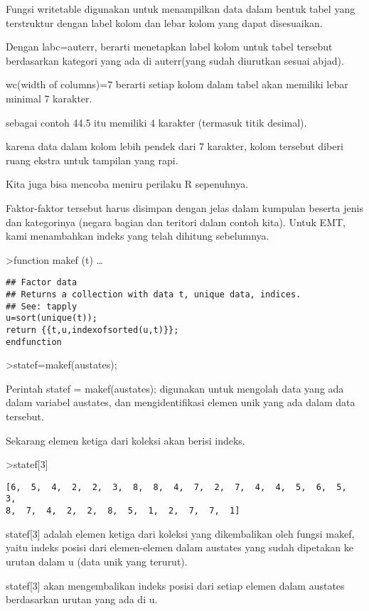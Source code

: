 \documentclass[
]{book}
\begin{document}
Fungsi writetable digunakan untuk menampilkan data dalam bentuk tabel yang terstruktur dengan label kolom dan lebar kolom yang dapat disesuaikan.

Dengan labc=auterr, berarti menetapkan label kolom untuk tabel tersebut berdasarkan kategori yang ada di auterr(yang sudah diurutkan sesuai abjad).

wc(width of columns)=7 berarti setiap kolom dalam tabel akan memiliki lebar minimal 7 karakter.

sebagai contoh 44.5 itu memiliki 4 karakter (termasuk titik desimal).

karena data dalam kolom lebih pendek dari 7 karakter, kolom tersebut diberi ruang ekstra untuk tampilan yang rapi.

Kita juga bisa mencoba meniru perilaku R sepenuhnya.

Faktor-faktor tersebut harus disimpan dengan jelas dalam kumpulan beserta jenis dan kategorinya (negara bagian dan teritori dalam contoh kita). Untuk EMT, kami menambahkan indeks yang telah dihitung sebelumnya.

\textgreater function makef (t) \ldots{}

\begin{verbatim}
## Factor data
## Returns a collection with data t, unique data, indices.
## See: tapply
u=sort(unique(t));
return {{t,u,indexofsorted(u,t)}};
endfunction
\end{verbatim}

\textgreater statef=makef(austates);

Perintah statef = makef(austates); digunakan untuk mengolah data yang ada dalam variabel austates, dan mengidentifikasi elemen unik yang ada dalam data tersebut.

Sekarang elemen ketiga dari koleksi akan berisi indeks.

\textgreater statef{[}3{]}

\begin{verbatim}
[6,  5,  4,  2,  2,  3,  8,  8,  4,  7,  2,  7,  4,  4,  5,  6,  5,  3,
8,  7,  4,  2,  2,  8,  5,  1,  2,  7,  7,  1]
\end{verbatim}

statef{[}3{]} adalah elemen ketiga dari koleksi yang dikembalikan oleh fungsi makef, yaitu indeks posisi dari elemen-elemen dalam austates yang sudah dipetakan ke urutan dalam u (data unik yang terurut).

statef{[}3{]} akan mengembalikan indeks posisi dari setiap elemen dalam austates berdasarkan urutan yang ada di u.
\end{document}
